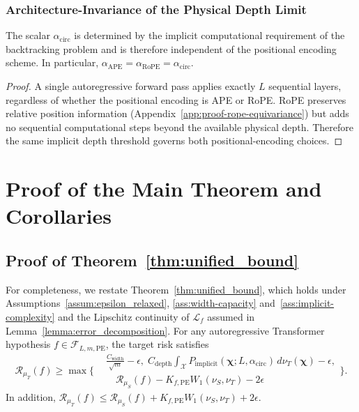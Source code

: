 \subsubsection{Architecture-Invariance of the Physical Depth Limit}
\label{lemma:physical_depth_limit}

\begin{lemma}
\label{lem:physical-depth-limit}
The scalar $\alpha_{\mathrm{circ}}$ is determined by the implicit computational requirement of the backtracking problem and is therefore independent of the positional encoding scheme. In particular, $\alpha_{\mathrm{APE}}=\alpha_{\mathrm{RoPE}}=\alpha_{\mathrm{circ}}$.
\end{lemma}

\begin{proof}
A single autoregressive forward pass applies exactly $L$ sequential layers, regardless of whether the positional encoding is APE or RoPE. RoPE preserves relative position information (Appendix~\ref{app:proof-rope-equivariance}) but adds no sequential computational steps beyond the available physical depth. Therefore the same implicit depth threshold governs both positional-encoding choices.
\end{proof}

\section{Proof of the Main Theorem and Corollaries}
\label{app:main-results}

\subsection{Proof of Theorem~\ref{thm:unified_bound}}
\label{app:proof-main-theorem}

For completeness, we restate Theorem~\ref{thm:unified_bound}, which holds under Assumptions~\ref{assum:epsilon_relaxed}, \ref{ass:width-capacity} and~\ref{ass:implicit-complexity} and the Lipschitz continuity of $\mathcal{L}_f$ assumed in Lemma~\ref{lemma:error_decomposition}.
For any autoregressive Transformer hypothesis $f \in \mathcal{F}_{L,m,\mathrm{PE}}$, the target risk satisfies
\begin{equation}
\mathcal{R}_{\mu_T}(f)
\ge
\max\Bigg\{
\begin{aligned}
&\frac{C_{\mathrm{width}}}{\sqrt{m}}-\epsilon,\;
C_{\mathrm{depth}}
\int_{\mathcal{X}}
P_{\mathrm{implicit}}(\boldsymbol{\chi};L,\alpha_{\mathrm{circ}})
\,d\nu_T(\boldsymbol{\chi})
-\epsilon,\\
&\quad\mathcal{R}_{\mu_S}(f)-K_{f,\mathrm{PE}}W_1(\nu_S,\nu_T)-2\epsilon
\end{aligned}
\Bigg\}.
\end{equation}
In addition, $\mathcal{R}_{\mu_T}(f)\le\mathcal{R}_{\mu_S}(f)+K_{f,\mathrm{PE}}W_1(\nu_S,\nu_T)+2\epsilon$.

